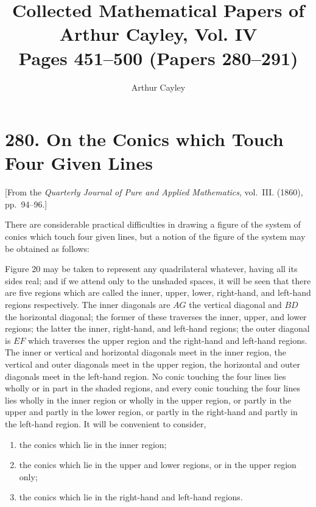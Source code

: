 \documentclass[11pt,a4paper]{article}
\title{\textbf{Collected Mathematical Papers of Arthur Cayley, Vol. IV}\\[6pt]
\large Pages 451--500 (Papers 280--291)}
\author{Arthur Cayley}
\date{}
\theoremstyle{plain}
\begin{document}
\maketitle
\thispagestyle{empty}

\setcounter{page}{429}

\section*{280. On the Conics which Touch Four Given Lines}
\label{sec:280}

[From the \textit{Quarterly Journal of Pure and Applied Mathematics}, vol.~III. (1860), pp.~94--96.]

There are considerable practical difficulties in drawing a figure of the system of conics which touch four given lines, but a notion of the figure of the system may be obtained as follows:

Figure 20 may be taken to represent any quadrilateral whatever, having all its sides real; and if we attend only to the unshaded spaces, it will be seen that there are five regions which are called the inner, upper, lower, right-hand, and left-hand regions respectively. The inner diagonals are $AG$ the vertical diagonal and $BD$ the horizontal diagonal; the former of these traverses the inner, upper, and lower regions; the latter the inner, right-hand, and left-hand regions; the outer diagonal is $EF$ which traverses the upper region and the right-hand and left-hand regions. The inner or vertical and horizontal diagonals meet in the inner region, the vertical and outer diagonals meet in the upper region, the horizontal and outer diagonals meet in the left-hand region. No conic touching the four lines lies wholly or in part in the shaded regions, and every conic touching the four lines lies wholly in the inner region or wholly in the upper region, or partly in the upper and partly in the lower region, or partly in the right-hand and partly in the left-hand region. It will be convenient to consider,
\begin{enumerate}
    \item[$1^\circ$] the conics which lie in the inner region;
    \item[$2^\circ$] the conics which lie in the upper and lower regions, or in the upper region only;
    \item[$3^\circ$] the conics which lie in the right-hand and left-hand regions.
\end{enumerate}
\end{document}
